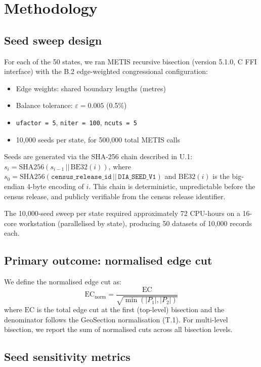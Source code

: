 \section{Methodology}
\label{sec:methodology}

\subsection{Seed sweep design}

For each of the 50 states, we ran METIS recursive bisection (version 5.1.0,
C FFI interface) with the B.2 edge-weighted congressional configuration:
\begin{itemize}
  \item Edge weights: shared boundary lengths (metres)
  \item Balance tolerance: $\varepsilon = 0.005$ (0.5\%)
  \item \texttt{ufactor = 5}, \texttt{niter = 100}, \texttt{ncuts = 5}
  \item 10,000 seeds per state, for 500,000 total METIS calls
\end{itemize}

Seeds are generated via the SHA-256 chain described in U.1:
$s_i = \mathrm{SHA256}(s_{i-1} \,||\, \mathrm{BE32}(i))$, where
$s_0 = \mathrm{SHA256}(\mathtt{census\_release\_id} \,||\, \mathtt{DIA\_SEED\_V1})$
and $\mathrm{BE32}(i)$ is the big-endian 4-byte encoding of $i$.
This chain is deterministic, unpredictable before the census release, and
publicly verifiable from the census release identifier.

The 10,000-seed sweep per state required approximately 72 CPU-hours on
a 16-core workstation (parallelised by state), producing 50 datasets of
10,000 records each.

\subsection{Primary outcome: normalised edge cut}

We define the normalised edge cut as:
\[
  \mathrm{EC}_{\mathrm{norm}} = \frac{\mathrm{EC}}{\sqrt{\min(|P_1|, |P_2|)}}
\]
where $\mathrm{EC}$ is the total edge cut at the first (top-level) bisection
and the denominator follows the GeoSection normalisation (T.1).
For multi-level bisection, we report the sum of normalised cuts across all
bisection levels.

\subsection{Seed sensitivity metrics}

